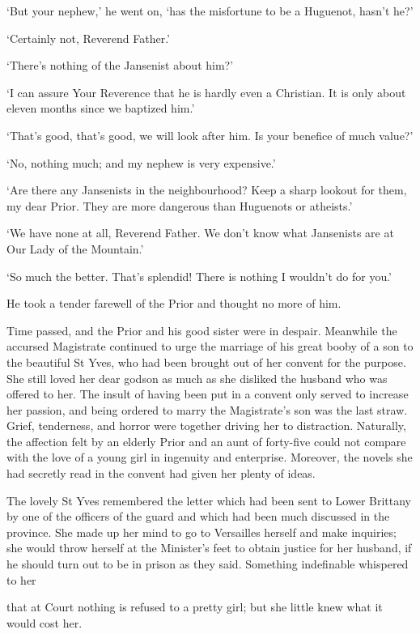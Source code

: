 \documentclass{article}
\begin{document}
\begin{center}
`But your nephew,' he went on, `has the misfortune to be a Huguenot, hasn't he?' 

`Certainly not, Reverend Father.' 

`There's nothing of the Jansenist about him?' 

`I can assure Your Reverence that he is hardly even a Christian. It is only about 
eleven months since we baptized him.' 

`That's good, that's good, we will look after him. Is your benefice of much value?' 

`No, nothing much; and my nephew is very expensive.' 

`Are there any Jansenists in the neighbourhood? Keep a sharp lookout for them, 
my dear Prior. They are more dangerous than Huguenots or atheists.' 

`We have none at all, Reverend Father. We don't know what Jansenists are at Our 
Lady of the Mountain.' 

`So much the better. That's splendid! There is nothing I wouldn't do for you.' 

He took a tender farewell of the Prior and thought no more of him. 

Time passed, and the Prior and his good sister were in despair. Meanwhile the accursed 
Magistrate continued to urge the marriage of his great booby of a son to the beautiful 
St Yves, who had been brought out of her convent for the purpose. She still loved 
her dear godson as much as she disliked the husband who was offered to her. The 
insult of having been put in a convent only served to increase her passion, and 
being ordered to marry the Magistrate's son was the last straw. Grief, tenderness, 
and horror were together driving her to distraction. Naturally, the affection felt 
by an elderly Prior and an aunt of forty-five could not compare with the love of 
a young girl in ingenuity and enterprise. Moreover, the novels she had secretly 
read in the convent had given her plenty of ideas. 

The lovely St Yves remembered the letter which had been sent to Lower Brittany 
by one of the officers of the guard and which had been much discussed in the province. 
She made up her mind to go to Versailles herself and make inquiries; she would 
throw herself at the Minister's feet to obtain justice for her husband, if he should 
turn out to be in prison as they said. Something indefinable whispered to her 

that at Court nothing is refused to a pretty girl; but she little knew what it 
would cost her. 


\end{center}
\end{document}
